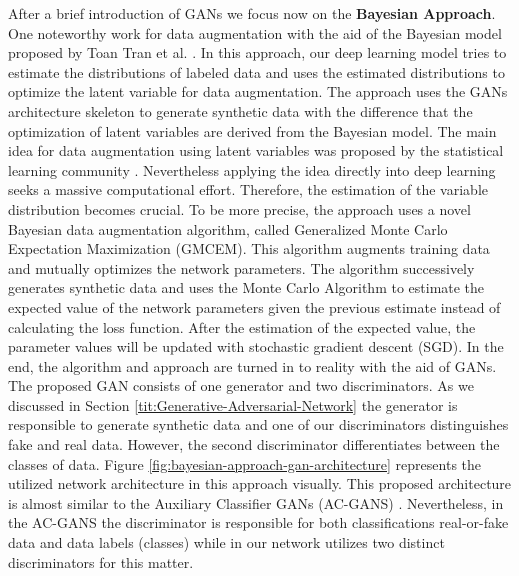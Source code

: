 After a brief introduction of GANs we focus now on the \textbf{Bayesian Approach}. One noteworthy work for data augmentation with the aid of the Bayesian model proposed by Toan Tran
et al. \cite{refrence_bayesian_approach}. In this approach, our deep learning model tries to estimate the
distributions of labeled data and uses the estimated distributions to optimize the latent
variable for data augmentation. The approach uses the GANs architecture skeleton to generate
synthetic data with the difference that the optimization of latent variables are derived from the Bayesian model.
The main idea for data augmentation using latent variables was proposed by the statistical learning
community \cite{Statistical_data_augmentation}. Nevertheless applying the idea directly into deep
learning seeks a massive computational effort. Therefore, the estimation of the variable
distribution becomes crucial. To be more precise, the
approach uses a novel Bayesian data augmentation algorithm, called Generalized Monte Carlo Expectation Maximization
(GMCEM). This algorithm augments training data and mutually optimizes the network parameters. The
algorithm successively generates synthetic data and uses the Monte Carlo Algorithm to estimate the expected value
of the network parameters given the previous estimate instead of calculating the loss function. After
the estimation of the expected value, the parameter values will be updated with stochastic gradient
descent (SGD). In the end, the algorithm and approach are turned in to reality with the aid of GANs. The
proposed GAN consists of one generator and two discriminators. As we discussed in Section
\ref{tit:Generative-Adversarial-Network} the generator is responsible to generate
synthetic data and one of our discriminators distinguishes fake and real data. However, the second
discriminator differentiates between the classes of data. Figure
\ref{fig:bayesian-approach-gan-architecture} represents the utilized network architecture in this
approach visually. This proposed architecture is almost similar to the Auxiliary Classifier GANs
(AC-GANS) \cite{AC_GANS}. Nevertheless, in the AC-GANS the discriminator is responsible for both
classifications real-or-fake data and data labels (classes) while in our network utilizes two
distinct discriminators for this matter.

